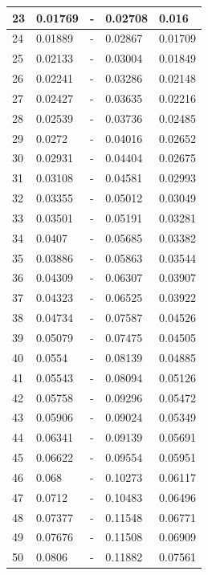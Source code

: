 \begin{tiny}
\begin{longtable}{|l|l|l|l|l|}
        23 & 0.01769 & - & 0.02708 & 0.016 \\ \hline
        24 & 0.01889 & - & 0.02867 & 0.01709 \\ \hline
        25 & 0.02133 & - & 0.03004 & 0.01849 \\ \hline
        26 & 0.02241 & - & 0.03286 & 0.02148 \\ \hline
        27 & 0.02427 & - & 0.03635 & 0.02216 \\ \hline
        28 & 0.02539 & - & 0.03736 & 0.02485 \\ \hline
        29 & 0.0272 & - & 0.04016 & 0.02652 \\ \hline
        30 & 0.02931 & - & 0.04404 & 0.02675 \\ \hline
        31 & 0.03108 & - & 0.04581 & 0.02993 \\ \hline
        32 & 0.03355 & - & 0.05012 & 0.03049 \\ \hline
        33 & 0.03501 & - & 0.05191 & 0.03281 \\ \hline
        34 & 0.0407 & - & 0.05685 & 0.03382 \\ \hline
        35 & 0.03886 & - & 0.05863 & 0.03544 \\ \hline
        36 & 0.04309 & - & 0.06307 & 0.03907 \\ \hline
        37 & 0.04323 & - & 0.06525 & 0.03922 \\ \hline
        38 & 0.04734 & - & 0.07587 & 0.04526 \\ \hline
        39 & 0.05079 & - & 0.07475 & 0.04505 \\ \hline
        40 & 0.0554 & - & 0.08139 & 0.04885 \\ \hline
        41 & 0.05543 & - & 0.08094 & 0.05126 \\ \hline
        42 & 0.05758 & - & 0.09296 & 0.05472 \\ \hline
        43 & 0.05906 & - & 0.09024 & 0.05349 \\ \hline
        44 & 0.06341 & - & 0.09139 & 0.05691 \\ \hline
        45 & 0.06622 & - & 0.09554 & 0.05951 \\ \hline
        46 & 0.068 & - & 0.10273 & 0.06117 \\ \hline
        47 & 0.0712 & - & 0.10483 & 0.06496 \\ \hline
        48 & 0.07377 & - & 0.11548 & 0.06771 \\ \hline
        49 & 0.07676 & - & 0.11508 & 0.06909 \\ \hline
        50 & 0.0806 & - & 0.11882 & 0.07561 \\ \hline

\end{longtable}
\end{tiny}
